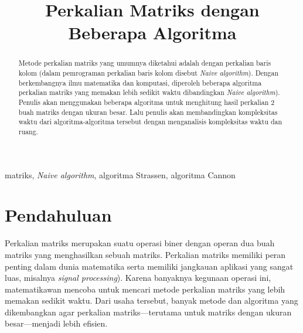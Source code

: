 \documentclass[conference]{IEEEtran}
\begin{document}
\title{Perkalian Matriks dengan Beberapa Algoritma}

\author{
}

\maketitle

\begin{abstract}
Metode perkalian matriks yang umumnya diketahui adalah dengan perkalian baris kolom (dalam pemrograman perkalian baris kolom disebut \textit{Naive algorithm}).
Dengan berkembangnya ilmu matematika dan komputasi, diperoleh beberapa algoritma perkalian matriks yang memakan lebih sedikit waktu dibandingkan \textit{Naive algorithm}).
Penulis akan menggunakan beberapa algoritma untuk menghitung hasil perkalian 2 buah matriks dengan ukuran besar.
Lalu penulis akan membandingkan kompleksitas waktu dari algoritma-algoritma tersebut dengan menganalisis kompleksitas waktu dan ruang.
\end{abstract}

\begin{IEEEkeywords}
matriks, \textit{Naive algorithm}, algoritma Strassen, algoritma Cannon
\end{IEEEkeywords}

\section{Pendahuluan}
Perkalian matriks merupakan suatu operasi biner dengan operan dua buah matriks yang menghasilkan sebuah matriks.
Perkalian matriks memiliki peran penting dalam dunia matematika serta memiliki jangkauan aplikasi yang sangat luas, misalnya \textit{signal processing}).
Karena banyaknya kegunaan operasi ini, matematikawan mencoba untuk mencari metode perkalian matriks yang lebih memakan sedikit waktu.
Dari usaha tersebut, banyak metode dan algoritma yang dikembangkan agar perkalian matriks---terutama untuk matriks dengan ukuran besar---menjadi lebih efisien.
\end{document}
